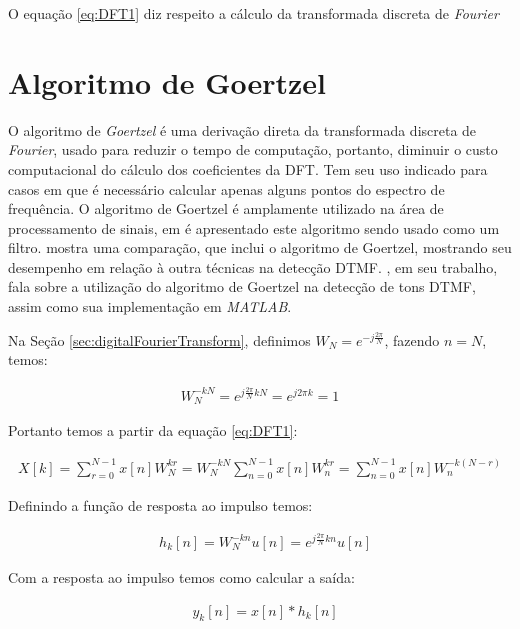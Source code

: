 \documentclass[monografia]{subfiles}
\begin{document}
		O equação \ref{eq:DFT1} diz respeito a cálculo da transformada discreta de \textit{Fourier}


		
	\section{Algoritmo de Goertzel}
	\label{sec:goertzelAlgorithm}
    O algoritmo de \textit{Goertzel} é uma derivação direta da transformada discreta de \textit{Fourier}, usado para reduzir o tempo de computação,
    portanto, diminuir o custo computacional do cálculo dos coeficientes da DFT. Tem seu uso indicado para casos em que é necessário calcular apenas
    alguns pontos do espectro de frequência. 
    O algoritmo de Goertzel é amplamente utilizado na área de processamento de sinais, em \cite{Zaplata} é apresentado este algoritmo sendo usado como
    um filtro. \cite{Selman} mostra uma comparação, que inclui o algoritmo de Goertzel, mostrando seu desempenho em relação à outra técnicas na detecção DTMF.
    \cite{Yuying}, em seu trabalho, fala sobre a utilização do algoritmo de Goertzel na detecção de tons DTMF, assim como sua implementação em \textit{MATLAB}.
    
    Na Seção \ref{sec:digitalFourierTransform}, definimos $W_{N}=e^{-j \frac{2\pi}{N}}$, fazendo $n=N$, 
    temos:

		\begin{align}
	    W_{N}^{-kN} = e^{j \frac{2\pi}{N}kN} = e^{j 2\pi k} = 1
		\end{align}

		Portanto temos a partir da equação \ref{eq:DFT1}:

		\begin{align}
			X[k] = \sum_{r=0}^{N-1}x[n] W_{N}^{kr} = W_{N}^{-kN} \sum_{n=0}^{N-1}x[n] W_{n}^{kr} = \sum_{n=0}^{N-1}x[n] W_{n}^{-k(N-r)}
		\end{align}

		Definindo a função de resposta ao impulso temos:

		\begin{align}
			&h_{k}[n] = W_{N}^{-kn} u[n] = e^{j \frac{2 \pi}{N} kn} u[n]%
		\end{align}

		Com a resposta ao impulso temos como calcular a saída:

		\begin{align}
			&y_{k}[n] = x[n] * h_{k}[n]
		\end{align}
\end{document}

